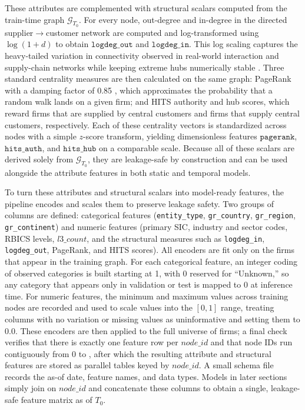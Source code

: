 These attributes are complemented with structural scalars computed from the train-time graph \(\mathcal{G}_{T_0}\). For every node, out-degree and in-degree in the directed supplier\(\rightarrow\)customer network are computed and log-transformed using \(\log(1 + d)\) to obtain \(\texttt{logdeg\_out}\) and \(\texttt{logdeg\_in}\). This log scaling captures the heavy-tailed variation in connectivity observed in real-world interaction and supply-chain networks while keeping extreme hubs numerically stable \parencite{clauset_power-law_2009,inoue_firm-level_2019}. Three standard centrality measures are then calculated on the same graph: PageRank with a damping factor of 0.85 \parencite{brin_anatomy_1998}, which approximates the probability that a random walk lands on a given firm; and HITS authority and hub scores, which reward firms that are supplied by central customers and firms that supply central customers, respectively. Each of these centrality vectors is standardized across nodes with a simple \(z\)-score transform, yielding dimensionless features \(\texttt{pagerank}\), \(\texttt{hits\_auth}\), and \(\texttt{hits\_hub}\) on a comparable scale. Because all of these scalars are derived solely from \(\mathcal{G}_{T_0}\), they are leakage-safe by construction and can be used alongside the attribute features in both static and temporal models.

To turn these attributes and structural scalars into model-ready features, the pipeline encodes and scales them to preserve leakage safety. Two groups of columns are defined: categorical features (\texttt{entity\_type}, \texttt{gr\_country}, \texttt{gr\_region}, \texttt{gr\_continent}) and numeric features (primary SIC, industry and sector codes, RBICS levels, \(l3\_count\), and the structural measures such as \texttt{logdeg\_in}, \texttt{logdeg\_out}, PageRank, and HITS scores). All encoders are fit only on the \TrainNodes firms that appear in the training graph. For each categorical feature, an integer coding of observed categories is built starting at 1, with 0 reserved for ``Unknown,'' so any category that appears only in validation or test is mapped to 0 at inference time. For numeric features, the minimum and maximum values across training nodes are recorded and used to scale values into the \([0,1]\) range, treating columns with no variation or missing values as uninformative and setting them to 0.0. These encoders are then applied to the full universe of \NumFirms firms; a final check verifies that there is exactly one feature row per \(\mathit{node\_id}\) and that node IDs run contiguously from 0 to \NumFirmsMinusOne, after which the resulting attribute and structural features are stored as parallel tables keyed by \(\mathit{node\_id}\). A small schema file records the as-of date, feature names, and data types. Models in later sections simply join on \(\mathit{node\_id}\) and concatenate these columns to obtain a single, leakage-safe feature matrix as of \(T_0\).

